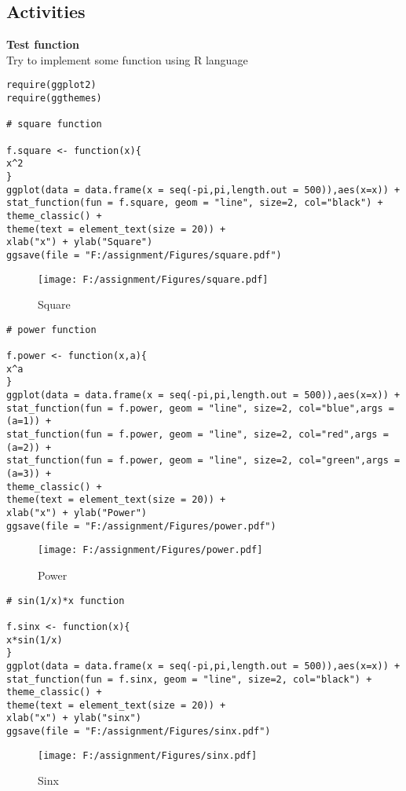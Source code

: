 \documentclass{article}
\begin{document}
\subsection*{Activities}
\textbf{Test function} \\
Try to implement some function using R language 
\begin{lstlisting}
require(ggplot2)
require(ggthemes)

# square function

f.square <- function(x){
x^2
}
ggplot(data = data.frame(x = seq(-pi,pi,length.out = 500)),aes(x=x)) +
stat_function(fun = f.square, geom = "line", size=2, col="black") +
theme_classic() + 
theme(text = element_text(size = 20)) +
xlab("x") + ylab("Square")
ggsave(file = "F:/assignment/Figures/square.pdf")
\end{lstlisting}
\begin{figure}[hbt]
\centering
\texttt{[image: F:/assignment/Figures/square.pdf]}
\caption{Square}
\end{figure}
\begin{lstlisting}
# power function

f.power <- function(x,a){
x^a
}
ggplot(data = data.frame(x = seq(-pi,pi,length.out = 500)),aes(x=x)) +
stat_function(fun = f.power, geom = "line", size=2, col="blue",args = (a=1)) +
stat_function(fun = f.power, geom = "line", size=2, col="red",args = (a=2)) +
stat_function(fun = f.power, geom = "line", size=2, col="green",args = (a=3)) +
theme_classic() + 
theme(text = element_text(size = 20)) +
xlab("x") + ylab("Power")
ggsave(file = "F:/assignment/Figures/power.pdf")
\end{lstlisting}
\begin{figure}[hbt]
\centering
\texttt{[image: F:/assignment/Figures/power.pdf]}
\caption{Power}
\end{figure}
\begin{lstlisting}
# sin(1/x)*x function

f.sinx <- function(x){
x*sin(1/x)
}
ggplot(data = data.frame(x = seq(-pi,pi,length.out = 500)),aes(x=x)) +
stat_function(fun = f.sinx, geom = "line", size=2, col="black") +
theme_classic() + 
theme(text = element_text(size = 20)) +
xlab("x") + ylab("sinx")
ggsave(file = "F:/assignment/Figures/sinx.pdf")
\end{lstlisting}
\begin{figure}[hbt]
\centering
\texttt{[image: F:/assignment/Figures/sinx.pdf]}
\caption{Sinx}
\end{figure}
\end{document}
